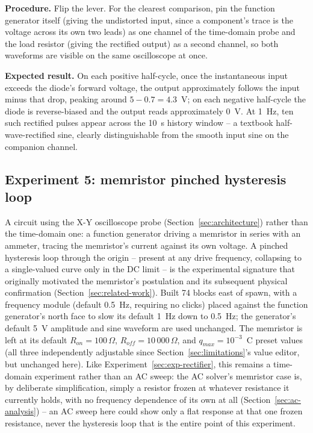 \textbf{Procedure.} Flip the lever. For the clearest comparison, pin the function generator
itself (giving the undistorted input, since a component's trace is the voltage across its
own two leads) as one channel of the time-domain probe and the load resistor (giving the
rectified output) as a second channel, so both waveforms are visible on the same
oscilloscope at once.

\textbf{Expected result.} On each positive half-cycle, once the instantaneous input exceeds
the diode's forward voltage, the output approximately follows the input minus that drop,
peaking around $5 - 0.7 = 4.3$~V; on each negative half-cycle the diode is reverse-biased and
the output reads approximately 0~V. At 1~Hz, ten such rectified pulses appear across the 10~s
history window -- a textbook half-wave-rectified sine, clearly distinguishable from the
smooth input sine on the companion channel.

\subsection{Experiment 5: memristor pinched hysteresis loop}
\label{sec:exp-memristor}

A circuit using the X-Y oscilloscope probe (Section~\ref{sec:architecture}) rather than the
time-domain one: a function generator driving a memristor in series with an ammeter, tracing
the memristor's current against its own voltage. A pinched hysteresis loop through the
origin -- present at any drive frequency, collapsing to a single-valued curve only in the DC
limit -- is the experimental signature that originally motivated the memristor's postulation
and its subsequent physical confirmation (Section~\ref{sec:related-work}). Built 74 blocks
east of spawn, with a frequency module (default 0.5~Hz, requiring no clicks) placed against
the function generator's north face to slow its default 1~Hz down to 0.5~Hz; the generator's
default 5~V amplitude and sine waveform are used unchanged. The memristor is left at its
default $R_{on}=100\,\Omega$, $R_{off}=10\,000\,\Omega$, and $q_{max}=10^{-3}$~C preset
values (all three independently adjustable since Section~\ref{sec:limitations}'s value
editor, but unchanged here). Like Experiment~\ref{sec:exp-rectifier}, this remains a
time-domain experiment rather than an AC sweep: the AC solver's memristor case is, by
deliberate simplification, simply a resistor frozen at whatever resistance it currently
holds, with no frequency dependence of its own at all (Section~\ref{sec:ac-analysis}) -- an
AC sweep here could show only a flat response at that one frozen resistance, never the
hysteresis loop that is the entire point of this experiment.

